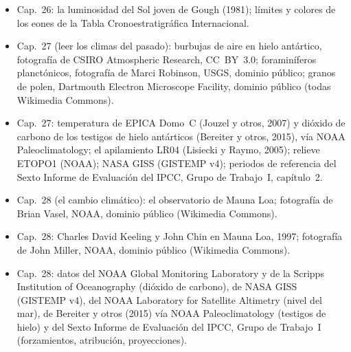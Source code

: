 \begin{itemize}
  \item Cap.~26: la luminosidad del Sol joven de Gough (1981); límites y colores de los eones de la Tabla Cronoestratigráfica Internacional.
  \item Cap.~27 (leer los climas del pasado): burbujas de aire en hielo antártico, fotografía de CSIRO Atmospheric Research, CC~BY~3.0; foraminíferos planctónicos, fotografía de Marci Robinson, USGS, dominio público; granos de polen, Dartmouth Electron Microscope Facility, dominio público (todas Wikimedia Commons).
  \item Cap.~27: temperatura de EPICA Domo~C (Jouzel y otros, 2007) y dióxido de carbono de los testigos de hielo antárticos (Bereiter y otros, 2015), vía NOAA Paleoclimatology; el apilamiento LR04 (Lisiecki y Raymo, 2005); relieve ETOPO1 (NOAA); NASA GISS (GISTEMP v4); periodos de referencia del Sexto Informe de Evaluación del IPCC, Grupo de Trabajo~I, capítulo~2.
  \item Cap.~28 (el cambio climático): el observatorio de Mauna Loa; fotografía de Brian Vasel, NOAA, dominio público (Wikimedia Commons).
  \item Cap.~28: Charles David Keeling y John Chin en Mauna Loa, 1997; fotografía de John Miller, NOAA, dominio público (Wikimedia Commons).
  \item Cap.~28: datos del NOAA Global Monitoring Laboratory y de la Scripps Institution of Oceanography (dióxido de carbono), de NASA GISS (GISTEMP v4), del NOAA Laboratory for Satellite Altimetry (nivel del mar), de Bereiter y otros (2015) vía NOAA Paleoclimatology (testigos de hielo) y del Sexto Informe de Evaluación del IPCC, Grupo de Trabajo~I (forzamientos, atribución, proyecciones).
\end{itemize}

